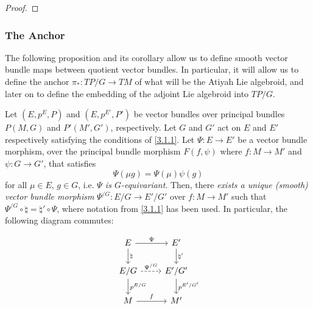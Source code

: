 \begin{proof}
\end{proof}

\subsubsection{The Anchor}

The following proposition and its corollary allow us to define smooth vector bundle maps between quotient vector bundles. In particular, it will allow us to define the anchor $\pi_*:TP/G \to TM$ of what will be the Atiyah Lie algebroid, and later on to define the embedding of the adjoint Lie algebroid into $TP/G$.

\begin{proposition} \label{3.1.2}
Let $(E, p^E, P)$ and $(E, p^{E'}, P')$ be vector bundles over principal bundles $P(M, G)$ and $P'(M', G')$, respectively. Let $G$ and $G'$ act on $E$ and $E'$ respectively satisfying the conditions of \ref{3.1.1}. Let $\Psi: E \to E'$ be a vector bundle morphism, over the principal bundle morphism $F(f, \psi)$ where $f:M\to M'$ and $\psi:G \to G'$, that satisfies \[\Psi(\mu g) = \Psi(\mu) \psi(g)\] for all $\mu \in E$, $g \in G$, i.e. \emph{$\Psi$ is $G$-equivariant}. Then, there \emph{exists a unique (smooth) vector bundle morphism} $\Psi^{/G}: E/G \to E'/G'$ over $f: M \to M'$ such that $\Psi^{/G} \circ \natural = \natural' \circ \Psi$, where notation from \ref{3.1.1} has been used. In particular, the following diagram commutes:

\begin{equation} \label{diagramQuotientMorph}
\begin{tikzcd}
    E   \ar{r}{\Psi}     \ar{d}{\natural} &   E'  \ar{d}{\natural'} \\
    E/G \ar[dashed]{r}{\Psi^{/G}} \ar{d}{p^{E/G}}  & E'/G' \ar{d}{p^{E'/G'}} \\
    M \ar{r}{f} & M'
\end{tikzcd}
\end{equation}
\end{proposition}

